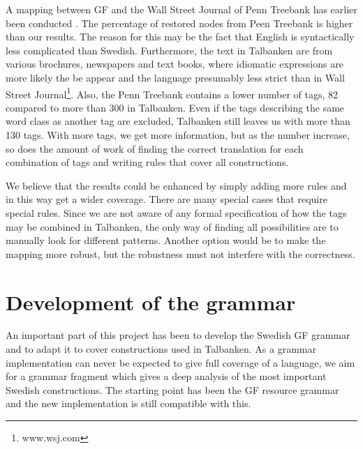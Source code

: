 \documentclass[10pt, a4paper]{article}
\begin{document}
A mapping between GF and the Wall Street Journal of Penn Treebank has earlier been conducted \cite{gfMech}.
The percentage of restored nodes from Peen Treebank is higher than our results.
The reason for this may be the fact that English is syntactically less complicated
than Swedish.
Furthermore, the text in Talbanken are from various brochures, newspapers and text books,
where idiomatic expressions are more likely the be appear and the language
presumably less strict than in Wall Street Journal\footnote{www.wsj.com}.
Also, the Penn Treebank contains a lower number of tags, 82 compared
to more than 300 in Talbanken. Even if the tags describing the same word
class as another tag are excluded, Talbanken still leaves us with more than 130 tags.
With more tags, we get more information, but as the number 
increase, so does the amount of work of finding the correct translation 
for each combination of tags and writing rules that cover all constructions. 

We believe that the results could be enhanced by simply adding more rules 
and in this way get a wider coverage. There are many special cases that require
special rules. Since we are not aware of any formal specification of how the tags may be
combined in Talbanken, the only way of finding all possibilities are to manually look
for different patterns. Another option would be to make the mapping more
robust, but the robustness must not interfere with the correctness.


\section{Development of the grammar}
\label{sec:grammar}
An important part of this project has been to develop the Swedish GF grammar and
to adapt it to cover constructions used in Talbanken. As a grammar
implementation can never be expected to give
full coverage of a language, we aim for a grammar fragment which gives a deep
analysis of the most important Swedish constructions.
The starting point has been the GF resource grammar and the new implementation is
still compatible with this.
\end{document}

